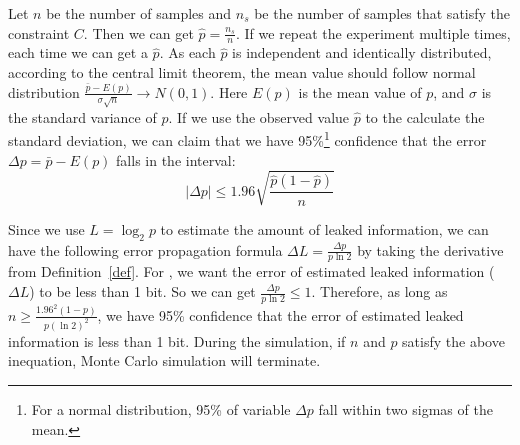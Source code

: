 Let $n$ be the number of samples and $n_s$ be the number of samples that satisfy
the constraint $C$. Then we can get $\hat{p} = \frac{n_s}{n}$. If we repeat the
experiment multiple times, each time we can get a $\hat{p}$. As each
$\hat{p}$ is independent and identically distributed, according to the central limit
theorem, the mean value should follow normal distribution
$ \frac{\bar{p}-E(p)}{\sigma\sqrt{n}} \rightarrow N(0,1) $. Here $E(p)$ is the
mean value of $p$, and $\sigma$ is the standard variance of $p$. If we use the
observed value $\hat{p}$ to the calculate the standard deviation, we can claim that
we have 95\%\footnote{For a normal distribution, 95\% of variable $\Delta p$ fall within two sigmas of the mean.} 
confidence that the error $\Delta p= \bar{p} - E(p)$ falls in the interval:
$$ |\Delta p| \leq 1.96\sqrt{\frac{ \hat{p} (1- \hat{p} )}{n}}$$

Since we use $L = \log_{2}p$ to estimate the amount of leaked information, we
can have the following error propagation formula $\Delta L = \frac{\Delta
p}{p\ln2}$ by taking the derivative from Definition~\ref{def}. For \tool, we want the error of estimated leaked
information ($\Delta L$) to be less than 1 bit. So we can get $\frac{\Delta
p}{p\ln2} \leq 1$. Therefore, as long as $ n \geq \frac{1.96^2(1-p)}{p(\ln2)^2}$, we have
95\% confidence that the error of estimated leaked information is less than 1 bit.
During the simulation, if $n$ and $p$ satisfy the above inequation, Monte Carlo
simulation will terminate.
